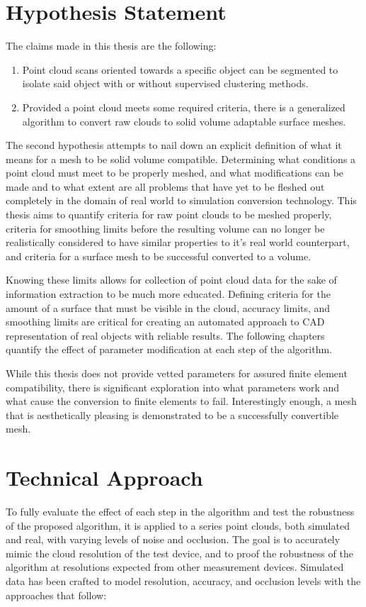 \documentclass[12pt]{drexelthesis}
\let\Oldsection\section
\renewcommand{\section}{\FloatBarrier\Oldsection}
\begin{document}
\section{Hypothesis Statement}
The claims made in this thesis are the following:

\begin{enumerate}
	\item Point cloud scans oriented towards a specific object can be segmented to isolate said object with or without supervised clustering methods.
	\item Provided a point cloud meets some required criteria, there is a generalized algorithm to convert raw clouds to solid volume adaptable surface meshes.
\end{enumerate}

The second hypothesis attempts to nail down an explicit definition of what it means for a mesh to be solid volume compatible. Determining what conditions a point cloud must meet to be properly meshed, and what modifications can be made and to what extent are all problems that have yet to be fleshed out completely in the domain of real world to simulation conversion technology. This thesis aims to quantify criteria for raw point clouds to be meshed properly, criteria for smoothing limits before the resulting volume can no longer be realistically considered to have similar properties to it's real world counterpart, and criteria for a surface mesh to be successful converted to a volume. 

Knowing these limits allows for collection of point cloud data for the sake of information extraction to be much more educated. Defining criteria for the amount of a surface that must be visible in the cloud, accuracy limits, and smoothing limits are critical for creating an automated approach to CAD representation of real objects with reliable results. The following chapters quantify the effect of parameter modification at each step of the algorithm.

While this thesis does not provide vetted parameters for assured finite element compatibility, there is significant exploration into what parameters work and what cause the conversion to finite elements to fail. Interestingly enough, a mesh that is aesthetically pleasing is demonstrated to be a successfully convertible mesh.

\section{Technical Approach}
To fully evaluate the effect of each step in the algorithm and test the robustness of the proposed algorithm, it is applied to a series point clouds, both simulated and real, with varying levels of noise and occlusion. The goal is to accurately mimic the cloud resolution of the test device, and to proof the robustness of the algorithm at resolutions expected from other measurement devices. Simulated data has been crafted to model resolution, accuracy, and occlusion levels with the approaches that follow:
\end{document}
